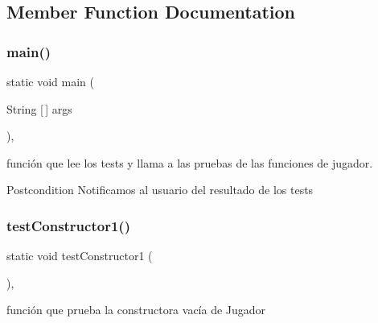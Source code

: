 \subsection{Member Function Documentation}
\mbox{\label{class_dominio_1_1controladores_1_1_drivers_1_1_driver_jugador_a31b15a500be1892e96d81c271adffacb}} 
\subsubsection{main()}
{\footnotesize\ttfamily static void main (\begin{DoxyParamCaption}\item[{String [$\,$]}]{args }\end{DoxyParamCaption})\hspace{0.3cm}{\ttfamily [inline]}, {\ttfamily [static]}}



función que lee los tests y llama a las pruebas de las funciones de jugador. 

\begin{DoxyPostcond}{Postcondition}
Notificamos al usuario del resultado de los tests 
\end{DoxyPostcond}
\mbox{\label{class_dominio_1_1controladores_1_1_drivers_1_1_driver_jugador_a6ff5d8ddaf3d8106a0d83f8cf237db84}} 
\subsubsection{test\+Constructor1()}
{\footnotesize\ttfamily static void test\+Constructor1 (\begin{DoxyParamCaption}{ }\end{DoxyParamCaption})\hspace{0.3cm}{\ttfamily [inline]}, {\ttfamily [static]}}



función que prueba la constructora vacía de Jugador 

